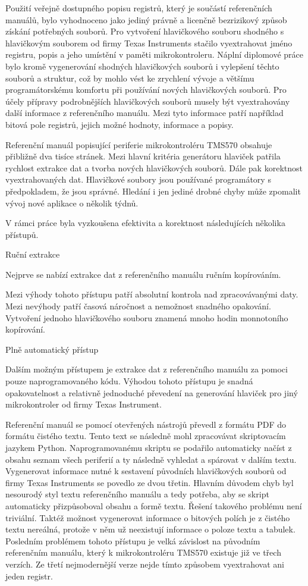 Použití veřejně dostupného popisu registrů, který je součástí referenčních manuálů, bylo vyhodnoceno jako jediný právně a licenčně bezrizikový způsob získání potřebných souborů.
Pro vytvoření hlavičkového souboru shodného s hlavičkovým souborem od firmy Texas Instruments stačilo vyextrahovat jméno registru, popis a jeho umístění v paměti mikrokontroleru.
Náplní diplomové práce bylo kromě vygenerování shodných hlavičkových souborů i vylepšení těchto souborů a struktur, což by mohlo vést ke zrychlení vývoje a většímu programátorskému komfortu při používání nových hlavičkových souborů.
Pro účely přípravy podrobnějších hlavičkových souborů musely být vyextrahovány další informace z referenčního manuálu.
Mezi tyto informace patří například bitová pole registrů, jejich možné hodnoty, informace a popisy.

Referenční manuál popisující periferie mikrokontroléru TMS570 obsahuje přibližně dva tisíce stránek.
Mezi hlavní kritéria generátoru hlaviček patřila rychlost extrakce dat a tvorba nových hlavičkových souborů.
Dále pak korektnost vyextrahovaných dat.
Hlavičkové soubory jsou používané programátory s předpokladem, že jsou správné.
Hledání i jen jediné drobné chyby může zpomalit vývoj nové aplikace o několik týdnů.

V rámci práce byla vyzkoušena efektivita a korektnost následujících několika přístupů.

\secc Ruční extrakce

	Nejprve se nabízí extrakce dat z referenčního manuálu ručním kopírováním.

Mezi výhody tohoto přístupu patří absolutní kontrola nad zpracovávanými daty.
Mezi nevýhody patří časová náročnost a nemožnost snadného opakování.
Vytvoření jednoho hlavičkového souboru znamená mnoho hodin monnotoního kopírování.

\secc Plně automatický přístup

	Dalším možným přístupem je extrakce dat z referenčního manuálu za pomoci pouze naprogramovaného kódu.
Výhodou tohoto přístupu je snadná opakovatelnost a relativně jednoduché převedení na generování hlaviček pro jiný mikrokontroler od firmy Texas Instrument.

Referenční manuál se pomocí otevřených nástrojů převedl z formátu PDF do formátu čistého textu.
Tento text se následně mohl zpracovávat skriptovacím jazykem Python.
Naprogramovanému skriptu se podařilo automaticky načíst z obsahu seznam všech periferií a ty následně vyhledat a spárovat v dalším textu.
Vygenerovat informace nutné k sestavení původních hlavičkových souborů od firmy Texas Instruments se povedlo ze dvou třetin.
Hlavním důvodem chyb byl nesourodý styl textu referenčního manuálu a tedy potřeba, aby se skript automaticky přizpůsoboval obsahu a formě textu.
Řešení takového problému není triviální.
Taktéž možnost vygenerovat informace o bitových polích je z čistého textu nereálná, protože v něm už neexistují informace o poloze textu a tabulek.
Posledním problémem tohoto přístupu je velká závislost na původním referenčním manuálu, který k mikrokontroléru TMS570 existuje již ve třech verzích.
Ze třetí nejmodernější verze nejde tímto způsobem vyextrahovat ani jeden registr.

